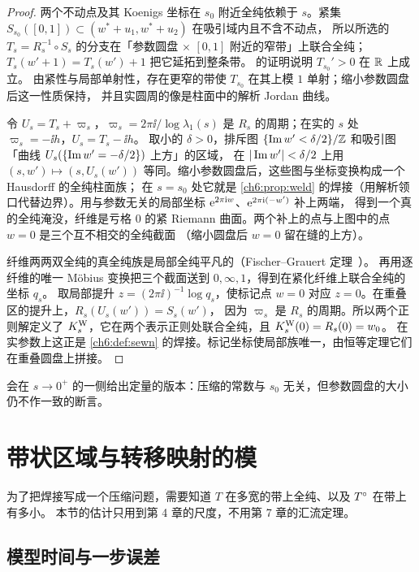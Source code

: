 \begin{proof}
两个不动点及其 Koenigs 坐标在 $s_0$ 附近全纯依赖于 $s$。紧集 $S_{s_0}([0,1])\subset(w^*+u_1,w^*+u_2)$ 在吸引域内且不含不动点，
所以所选的 $T_s=R_s^{-1}\circ S_s$ 的分支在「参数圆盘 $\times$ $[0,1]$ 附近的窄带」上联合全纯；
$T_s(w'+1)=T_s(w')+1$ 把它延拓到整条带。 的证明说明 $T_{s_0}'>0$ 在 $\mathbb{R}$ 上成立。
由紧性与局部单射性，存在更窄的带使 $T_{s_0}$ 在其上模 $1$ 单射；缩小参数圆盘后这一性质保持，
并且实圆周的像是柱面中的解析 Jordan 曲线。

令 $U_s=T_s+\varpi_s$，$\varpi_s=2\pi\ii/\log\lambda_1(s)$ 是 $R_s$ 的周期；在实的 $s$ 处 $\varpi_s=-\ii h$，$U_s=T_s-\ii h$。
取小的 $\delta>0$，排斥图 $\{\operatorname{Im} w'<\delta/2\}/\mathbb{Z}$ 和吸引图「曲线 $U_s(\{\operatorname{Im} w'=-\delta/2\})$ 上方」的区域，
在 $|\operatorname{Im} w'|<\delta/2$ 上用 $(s,w')\mapsto(s,U_s(w'))$ 等同。缩小参数圆盘后，这些图与坐标变换构成一个 Hausdorff 的全纯柱面族；
在 $s=s_0$ 处它就是 \cref{ch6:prop:weld} 的焊接（用解析领口代替边界）。用与参数无关的局部坐标 $\mathrm{e}^{2\pi\mathrm{i} w}$、$\mathrm{e}^{2\pi\mathrm{i} (-w')}$ 补上两端，
得到一个真的全纯淹没，纤维是亏格 $0$ 的紧 Riemann 曲面。两个补上的点与上图中的点 $w=0$ 是三个互不相交的全纯截面
（缩小圆盘后 $w=0$ 留在缝的上方）。

纤维两两双全纯的真全纯族是局部全纯平凡的（Fischer--Grauert 定理~\cite{FischerGrauert1965}）。
再用逐纤维的唯一 Möbius 变换把三个截面送到 $0,\infty,1$，得到在紧化纤维上联合全纯的坐标 $q_s$。
取局部提升 $z=(2\pi\ii)^{-1}\log q_s$，使标记点 $w=0$ 对应 $z=0$。在重叠区的提升上，$R_s(U_s(w'))=S_s(w')$，
因为 $\varpi_s$ 是 $R_s$ 的周期。所以两个正则解定义了 $K^{\mathrm W}_s$，它在两个表示正则处联合全纯，且 $K^{\mathrm W}_s(0)=R_s(0)=w_0$。
在实参数上这正是 \cref{ch6:def:sewn} 的焊接。标记坐标使局部族唯一，由恒等定理它们在重叠圆盘上拼接。
\end{proof}

 会在 $s\to0^+$ 的一侧给出定量的版本：压缩的常数与 $s_0$ 无关，但参数圆盘的大小仍不作一致的断言。

\section{带状区域与转移映射的模}\label{ch6:sec:band}

为了把焊接写成一个压缩问题，需要知道 $T$ 在多宽的带上全纯、以及 $T^{\circ}$ 在带上有多小。
本节的估计只用到第 4 章的尺度，不用第 7 章的汇流定理。

\subsection{模型时间与一步误差}


